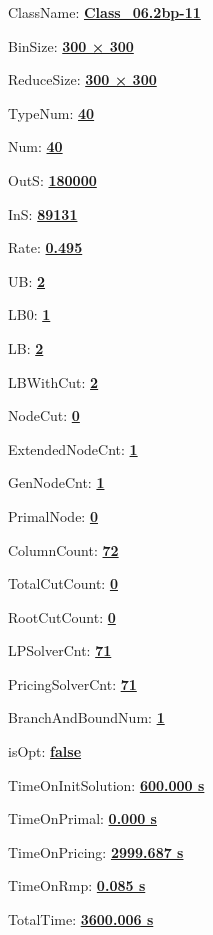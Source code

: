 \documentclass[11pt]{article}
\begin{document}
\pagestyle{empty}


ClassName: \underline{\textbf{Class_06.2bp-11}}
\par
BinSize: \underline{\textbf{300 × 300}}
\par
ReduceSize: \underline{\textbf{300 × 300}}
\par
TypeNum: \underline{\textbf{40}}
\par
Num: \underline{\textbf{40}}
\par
OutS: \underline{\textbf{180000}}
\par
InS: \underline{\textbf{89131}}
\par
Rate: \underline{\textbf{0.495}}
\par
UB: \underline{\textbf{2}}
\par
LB0: \underline{\textbf{1}}
\par
LB: \underline{\textbf{2}}
\par
LBWithCut: \underline{\textbf{2}}
\par
NodeCut: \underline{\textbf{0}}
\par
ExtendedNodeCnt: \underline{\textbf{1}}
\par
GenNodeCnt: \underline{\textbf{1}}
\par
PrimalNode: \underline{\textbf{0}}
\par
ColumnCount: \underline{\textbf{72}}
\par
TotalCutCount: \underline{\textbf{0}}
\par
RootCutCount: \underline{\textbf{0}}
\par
LPSolverCnt: \underline{\textbf{71}}
\par
PricingSolverCnt: \underline{\textbf{71}}
\par
BranchAndBoundNum: \underline{\textbf{1}}
\par
isOpt: \underline{\textbf{false}}
\par
TimeOnInitSolution: \underline{\textbf{600.000 s}}
\par
TimeOnPrimal: \underline{\textbf{0.000 s}}
\par
TimeOnPricing: \underline{\textbf{2999.687 s}}
\par
TimeOnRmp: \underline{\textbf{0.085 s}}
\par
TotalTime: \underline{\textbf{3600.006 s}}
\par
\newpage
\end{document}

